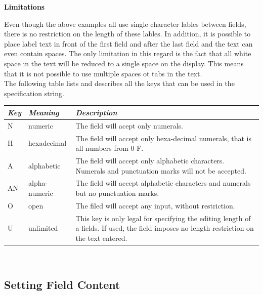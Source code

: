 \begin{center}
\end{center}

\textbf{Limitations}

Even though the above examples all use single character lables between
fields, there is no restriction on the length of these lables. In
addition, it is possible to place label text in front of the first field
and after the last field and the text can even contain spaces. The only
limitation in this regard is the fact that all white space in the text
will be reduced to a single space on the display. This means that it is
not possible to use multiple spaces ot tabs in the text.\\

The following table lists and describes all the keys that can be used in
the specification string.\\

\begin{center}
\begin{tabularx}{\textwidth}{|l|l|X|}
\hline \textit{Key} & \textit{Meaning} & \textit{Description} \\
\hline N & numeric & The field will acept only numerals.\\
\hline H & hexadecimal & The field will accept only hexa-decimal numerals, that is all numbers from 0-F.\\
\hline A & alphabetic & The field will accept only alphabetic characters. Numerals and punctuation marks will not be accepted.\\
\hline AN & alpha-numeric & The field will accept alphabetic characters and numerals but no punctuation marks.\\
\hline O & open & The filed will accept any input, without restriction.\\
\hline U & unlimited & This key is only legal for specifying the editing length of a fields. If used, the field imposes no length restriction on the text entered.\\
\hline
\end{tabularx}\
\end{center}

\subsection{Setting Field Content}

